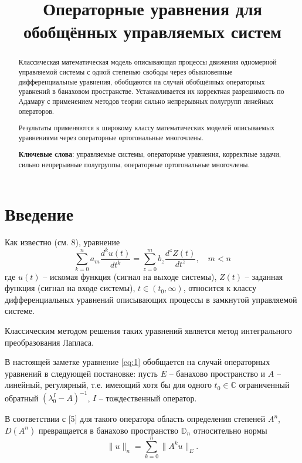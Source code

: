 \documentclass[1244sdpt,a4paper]{article}
\title{Операторные уравнения для обобщённых управляемых систем}
\theoremstyle{plain}
\numberwithin{equation}{section}
\begin{document}
\begin{abstract}
    Классическая математическая модель описывающая процессы движения одномерной управляемой системы с одной
    степенью свободы через обыкновенные дифференциальные уравнения, обобщаются на случай обобщённых операторных
    уравнений в банаховом пространстве. Устанавливается их корректная разрешимость по Адамару с применением
    методов теории сильно непрерывных полугрупп линейных операторов.

    Результаты применяются к широкому классу математических моделей описываемых уравнениями через
    операторные ортогональные многочлены.

    \textbf{Ключевые слова}: управляемые системы, операторные уравнения, корректные задачи,
    сильно непрерывные полугруппы, операторные ортогональные многочлены.
\end{abstract}

\maketitle
\tableofcontents

\section{Введение}

Как известно (см. 8), уравнение
\begin{equation}
    \label{eq:1}
    \sum_{k=0}^{n} a_m \frac{d^k u(t)}{dt^k} = \sum_{z=0}^{m} b_z \frac{d^z Z(t)}{dt^z}, \quad m < n
\end{equation}
где $u(t)$ -- искомая функция (сигнал на выходе системы), $Z(t)$ -- заданная функция (сигнал на входе системы),
$t \in (t_0, \infty)$, относится к классу дифференциальных уравнений описывающих процессы в замкнутой
управляемой системе.

Классическим методом решения таких уравнений является метод интегрального преобразования Лапласа.

В настоящей заметке уравнение \ref{eq:1} обобщается на случай операторных уравнений в следующей постановке:
пусть $E$ -- банахово пространство и $A$ -- линейный, регулярный, т.е. имеющий хотя бы для одного $t_0 \in \mathbb{C}$
ограниченный обратный $(\lambda_0^I - A)^{-1}$, $I$ -- тождественный оператор.

В соответствии с [5] для такого оператора область определения степеней $A^n$, $D(A^n)$ превращается в
банахово пространство $\mathbb{D}_n$ относительно нормы
\begin{equation}
    \|u\|_n = \sum_{k=0}^{n} \|A^k u\|_E.
\end{equation}
\end{document}
